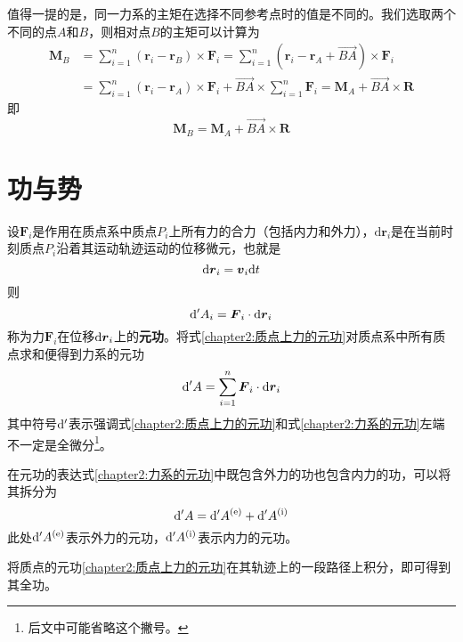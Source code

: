 值得一提的是，同一力系的主矩在选择不同参考点时的值是不同的。我们选取两个不同的点$A$和$B$，则相对点$B$的主矩可以计算为
\begin{align*}
	\boldsymbol{M}_B & = \sum_{i=1}^n (\boldsymbol{r}_{i} - \boldsymbol{r}_B) \times \boldsymbol{F}_i = \sum_{i=1}^n (\boldsymbol{r}_{i} - \boldsymbol{r}_A + \vec{BA}) \times \boldsymbol{F}_i \\
	& = \sum_{i=1}^n (\boldsymbol{r}_{i} - \boldsymbol{r}_A) \times \boldsymbol{F}_i + \vec{BA} \times \sum_{i=1}^n\boldsymbol{F}_i = \boldsymbol{M}_A + \vec{BA} \times \boldsymbol{R}
\end{align*}
即
\begin{equation}
	\boldsymbol{M}_B = \boldsymbol{M}_A + \vec{BA} \times \boldsymbol{R}
	\label{chapter2:不同参考点力矩之间的关系}
\end{equation}

\section{功与势}

设$\boldsymbol{F}_i$是作用在质点系中质点$P_i$上所有力的合力（包括内力和外力），$\mathrm{d}\boldsymbol{r}_i$是在当前时刻质点$P_i$沿着其运动轨迹运动的位移微元，也就是
\begin{equation}
	\mathrm{d} \boldsymbol{r}_i = \boldsymbol{v}_i\mathrm{d} t
\end{equation}
则
\begin{equation}
	\mathrm{d}'A_i = \boldsymbol{F}_i\cdot \mathrm{d}\boldsymbol{r}_i
	\label{chapter2:质点上力的元功}
\end{equation}
称为力$\boldsymbol{F}_i$在位移$\mathrm{d}\boldsymbol{r}_i$上的{\bf 元功}。将式\eqref{chapter2:质点上力的元功}对质点系中所有质点求和便得到力系的元功
\begin{equation}
	\mathrm{d}'A = \sum_{i=1}^n \boldsymbol{F}_i\cdot \mathrm{d} \boldsymbol{r}_i
	\label{chapter2:力系的元功}
\end{equation}
其中符号$\mathrm{d}'$表示强调式\eqref{chapter2:质点上力的元功}和式\eqref{chapter2:力系的元功}左端不一定是全微分\footnote{后文中可能省略这个撇号。}。

在元功的表达式\eqref{chapter2:力系的元功}中既包含外力的功也包含内力的功，可以将其拆分为
\begin{equation}
	\mathrm{d}'A = \mathrm{d}'A^{(\mathrm{e})} + \mathrm{d}'A^{(\mathrm{i})}
\end{equation}
此处$\mathrm{d}'A^{(\mathrm{e})}$表示外力的元功，$\mathrm{d}'A^{(\mathrm{i})}$表示内力的元功。

将质点的元功\eqref{chapter2:质点上力的元功}在其轨迹上的一段路径上积分，即可得到其全功。

